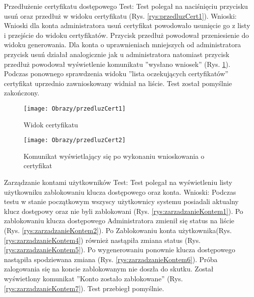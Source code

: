 \begin{enumerate*}
\newpage
	\item  Przedłużenie certyfikatu dostępowego\newline
	Test: Test polegał na naciśnięciu przycisku usuń oraz przedłuż w widoku certyfikatu (Rys. \ref{rys:przedluzCert1}).\newline
	Wnioski: Wnioski dla konta administratora usuń certyfikat powodowało usunięcie go z listy i przejście do widoku certyfikatów. Przycisk przedłuż powodował przeniesienie do widoku generowania. Dla konta o uprawnieniach  mniejszych od administratora przycisk usuń działał analogicznie jak u administratora natomiast przycisk przedłuż powodował wyświetlenie komunikatu ''wysłano wniosek'' (Rys. \ref{rys:przedluzCert2}).
	Podczas ponownego sprawdzenia  widoku ''lista oczekujących certyfikatów'' certyfikat uprzednio zawnioskowany  widniał  na liście. Test został pomyślnie zakończony.
	
	\begin{figure}[ht!]
		\centering
		\begin{minipage}{0.2\textwidth}
			\texttt{[image: Obrazy/przedluzCert1]}
			\caption{Widok certyfikatu }
			\label{rys:przedluzCert1}
		\end{minipage}
	\hspace{0.02\textwidth}
		\begin{minipage}{0.4\textwidth}
			\texttt{[image: Obrazy/przedluzCert2]}
			\caption{Komunikat wyświetlający się po wykonaniu wnioskowania o certyfikat }
			\label{rys:przedluzCert2}
		\end{minipage}
	\end{figure}

	\item Zarządzanie kontami użytkowników\newline
		Test: Test polegał na wyświetleniu listy użytkowniku zablokowaniu klucza dostępowego oraz konta.\newline
		Wnioski: Podczas testu w stanie początkowym wszyscy użytkownicy systemu posiadali aktualny klucz dostępowy oraz nie byli zablokowani (Rys. \ref{rys:zarzadzanieKontem1}). Po zablokowaniu klucza dostępowego  Administratora zmienił się status na liście (Rys. \ref{rys:zarzadzanieKontem2}). Po Zablokowaniu konta użytkownika(Rys. \ref{rys:zarzadzanieKontem4}) również nastąpiła zmiana  status  (Rys. \ref{rys:zarzadzanieKontem5}). Po wygenerowaniu ponownie klucza dostępowego nastąpiła spodziewana zmiana (Rys. \ref{rys:zarzadzanieKontem6}). Próba zalogowania się na koncie zablokowanym nie doszła do skutku. Został wyświetlony komunikat ''Konto zostało zablokowane'' (Rys. \ref{rys:zarzadzanieKontem7}). Test przebiegł pomyślnie.	
		

\end{enumerate*}
